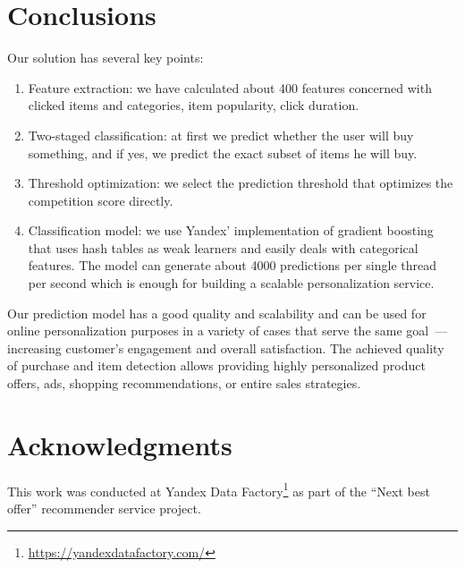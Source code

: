 \documentclass{sig-alternate}
\begin{document}
\section{Conclusions}
Our solution has several key points:
\begin{enumerate}
    \item Feature extraction: we have calculated about 400 features concerned with clicked items
        and categories, item popularity, click duration.
    \item Two-staged classification: at first we predict whether the user will buy something,
        and if yes, we predict the exact subset of items he will buy.
    \item Threshold optimization: we select the prediction threshold that optimizes the competition score directly.
    \item Classification model: we use Yandex' implementation of gradient boosting
        that uses hash tables as weak learners and easily deals with categorical features.
        The model can generate about 4000 predictions per single thread per second
        which is enough for building a scalable personalization service.
\end{enumerate}

Our prediction model has a good quality and scalability and can be used
for online personalization purposes in a variety of cases that serve the same goal~---
increasing customer's engagement and overall satisfaction.
The achieved quality of purchase and item detection allows providing highly personalized
product offers, ads, shopping recommendations, or entire sales strategies.

\section{Acknowledgments}
This work was conducted at Yandex Data Factory\footnote{\small{\url{https://yandexdatafactory.com/}}}
as part of the ``Next best offer'' recommender service project.




\end{document}
